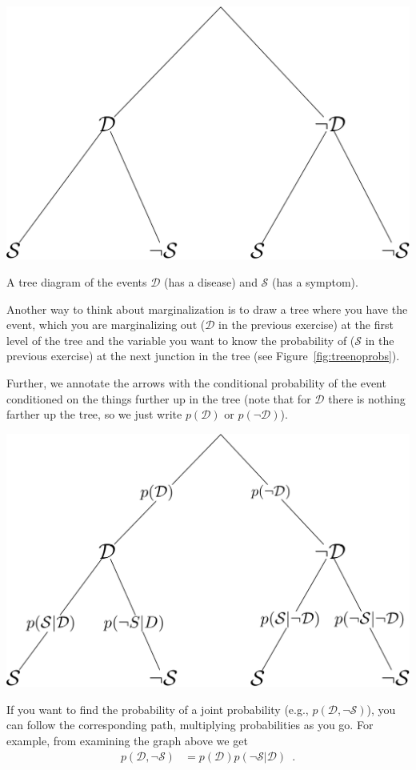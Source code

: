 \documentclass[assignment01_Solutions]{subfiles}
\begin{document}
\begin{marginfigure}
\includegraphics[width=\linewidth]{figures/treenoprobs}
\caption{A tree diagram of the events $\mathcal{D}$ (has a disease) and $\mathcal{S}$ (has a symptom).\label{fig:treenoprobs}}
\end{marginfigure}
Another way to think about marginalization is to draw a tree where you have the event, which you are marginalizing out ($\mathcal{D}$ in the previous exercise) at the first level of the tree and the variable you want to know the probability of ($\mathcal{S}$ in the previous exercise) at the next junction in the tree (see Figure~\ref{fig:treenoprobs}).


Further, we annotate the arrows with the conditional probability of the event conditioned on the things further up in the tree (note that for $\mathcal{D}$ there is nothing farther up the tree, so we just write $p(\mathcal{D})$ or $p(\neg \mathcal{D})$).

\begin{center}
\includegraphics[width=0.6\linewidth]{figures/treeprobs}
\end{center}

If you want to find the probability of a joint probability (e.g., $p(\mathcal{D}, \neg \mathcal{S})$), you can follow the corresponding path, multiplying probabilities as you go.  For example, from examining the graph above we get
\begin{align}
p(\mathcal{D}, \neg \mathcal{S}) &= p(\mathcal{D}) p(\neg \mathcal{S}|\mathcal{D}) \enspace .
\end{align}
\end{document}
